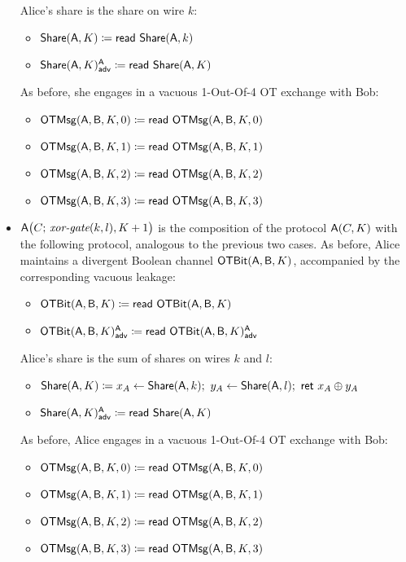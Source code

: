 \begin{itemize}
\begin{itemize}
\end{itemize}
Alice's share is the share on wire $k$:
\begin{itemize}
\item $\Share(\A,K) \coloneqq \read{\Share(\A,k)}$
\item {\color{blue} $\LeakShare(\A,K)^\A_\adv \coloneqq \read{\Share(\A,K)}$}
\end{itemize}
As before, she engages in a vacuous 1-Out-Of-4 OT exchange with Bob:
\begin{itemize}
\item $\OTMsg(\A,\B,K,0) \coloneqq \read{\OTMsg(\A,\B,K,0)}$
\item $\OTMsg(\A,\B,K,1) \coloneqq \read{\OTMsg(\A,\B,K,1)}$
\item $\OTMsg(\A,\B,K,2) \coloneqq \read{\OTMsg(\A,\B,K,2)}$
\item $\OTMsg(\A,\B,K,3) \coloneqq \read{\OTMsg(\A,\B,K,3)}$
\end{itemize}
\item $\A\big(C; \, \xorgate(k,l),K+1\big)$ is the composition of the protocol $\A(C,K)$ with the following protocol, analogous to the previous two cases. As before, Alice maintains a divergent Boolean channel $\OTBit(\A,\B,K)$, accompanied by the corresponding vacuous leakage:
\begin{itemize}
\item $\OTBit(\A,\B,K) \coloneqq \read{\OTBit(\A,\B,K)}$
\item {\color{blue} $\LeakOTBit(\A,\B,K)^\A_\adv \coloneqq \read{\LeakOTBit(\A,\B,K)^\A_\adv}$}
\end{itemize}
Alice's share is the sum of shares on wires $k$ and $l$:
\begin{itemize}
\item $\Share(\A,K) \coloneqq x_A \leftarrow \Share(\A,k); \ y_A \leftarrow \Share(\A,l); \ \ret{x_A \oplus y_A}$
\item {\color{blue} $\LeakShare(\A,K)^\A_\adv \coloneqq \read{\Share(\A,K)}$}
\end{itemize}
As before, Alice engages in a vacuous 1-Out-Of-4 OT exchange with Bob:
\begin{itemize}
\item $\OTMsg(\A,\B,K,0) \coloneqq \read{\OTMsg(\A,\B,K,0)}$
\item $\OTMsg(\A,\B,K,1) \coloneqq \read{\OTMsg(\A,\B,K,1)}$
\item $\OTMsg(\A,\B,K,2) \coloneqq \read{\OTMsg(\A,\B,K,2)}$
\item $\OTMsg(\A,\B,K,3) \coloneqq \read{\OTMsg(\A,\B,K,3)}$

\end{itemize}
\end{itemize}
